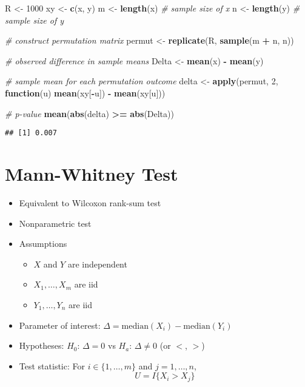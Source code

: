 \documentclass[
]{book}
\newenvironment{Shaded}{\begin{snugshade}}{\end{snugshade}}
\newcommand{\CommentTok}[1]{\textcolor[rgb]{0.56,0.35,0.01}{\textit{#1}}}
\newcommand{\ControlFlowTok}[1]{\textcolor[rgb]{0.13,0.29,0.53}{\textbf{#1}}}
\newcommand{\DecValTok}[1]{\textcolor[rgb]{0.00,0.00,0.81}{#1}}
\newcommand{\KeywordTok}[1]{\textcolor[rgb]{0.13,0.29,0.53}{\textbf{#1}}}
\newcommand{\NormalTok}[1]{#1}
\newcommand{\OperatorTok}[1]{\textcolor[rgb]{0.81,0.36,0.00}{\textbf{#1}}}
\newcommand{\StringTok}[1]{\textcolor[rgb]{0.31,0.60,0.02}{#1}}
\providecommand{\tightlist}{%
  \setlength{\itemsep}{0pt}\setlength{\parskip}{0pt}}
\begin{document}
\begin{Shaded}
\begin{Highlighting}[]
\NormalTok{R <-}\StringTok{ }\DecValTok{1000}
\NormalTok{xy <-}\StringTok{ }\KeywordTok{c}\NormalTok{(x, y)}
\NormalTok{m <-}\StringTok{ }\KeywordTok{length}\NormalTok{(x) }\CommentTok{# sample size of x}
\NormalTok{n <-}\StringTok{ }\KeywordTok{length}\NormalTok{(y) }\CommentTok{# sample size of y}

\CommentTok{# construct permutation matrix}
\NormalTok{permut <-}\StringTok{ }\KeywordTok{replicate}\NormalTok{(R, }\KeywordTok{sample}\NormalTok{(m }\OperatorTok{+}\StringTok{ }\NormalTok{n, n))}

\CommentTok{# observed difference in sample means}
\NormalTok{Delta <-}\StringTok{ }\KeywordTok{mean}\NormalTok{(x) }\OperatorTok{-}\StringTok{ }\KeywordTok{mean}\NormalTok{(y)}

\CommentTok{# sample mean for each permutation outcome}
\NormalTok{delta <-}\StringTok{ }\KeywordTok{apply}\NormalTok{(permut, }\DecValTok{2}\NormalTok{,}
               \ControlFlowTok{function}\NormalTok{(u) }\KeywordTok{mean}\NormalTok{(xy[}\OperatorTok{-}\NormalTok{u]) }\OperatorTok{-}\StringTok{ }\KeywordTok{mean}\NormalTok{(xy[u]))}

\CommentTok{# p-value}
\KeywordTok{mean}\NormalTok{(}\KeywordTok{abs}\NormalTok{(delta) }\OperatorTok{>=}\StringTok{ }\KeywordTok{abs}\NormalTok{(Delta))}
\end{Highlighting}
\end{Shaded}

\begin{verbatim}
## [1] 0.007
\end{verbatim}

\hypertarget{mann-whitney-test}{%
\section{Mann-Whitney Test}\label{mann-whitney-test}}

\begin{itemize}
\tightlist
\item
  Equivalent to Wilcoxon rank-sum test
\item
  Nonparametric test
\item
  Assumptions

  \begin{itemize}
  \tightlist
  \item
    \(X\) and \(Y\) are independent
  \item
    \(X_1, \dots, X_m\) are iid
  \item
    \(Y_1, \dots, Y_n\) are iid
  \end{itemize}
\item
  Parameter of interest:
  \(\Delta = \mathrm{median}(X_i) - \mathrm{median}(Y_i)\)
\item
  Hypotheses: \(H_0\): \(\Delta = 0\) vs \(H_a\): \(\Delta \neq 0\) (or \(<\), \(>\))
\item
  Test statistic: For \(i \in \{1, \dots, m\}\) and \(j = 1, \dots, n\),
  \[U = I\{X_i > X_j\}\]
\end{itemize}
\end{document}
